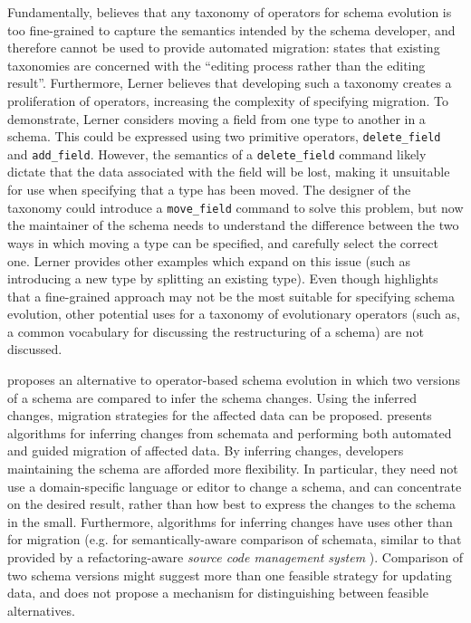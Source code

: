 Fundamentally, \cite{lerner00model} believes that any taxonomy of operators for schema evolution is too fine-grained to capture the semantics intended by the schema developer, and therefore cannot be used to provide automated migration: \cite{lerner00model} states that existing taxonomies are concerned with the ``editing process rather than the editing result''. Furthermore, Lerner believes that developing such a taxonomy creates a proliferation of operators, increasing the complexity of specifying migration. To demonstrate, Lerner  considers moving a field from one type to another in a schema. This could be expressed using two primitive operators, \verb|delete_field| and \verb|add_field|. However, the semantics of a \verb|delete_field| command likely dictate that the data associated with the field will be lost, making it unsuitable for use when specifying that a type has been moved. The designer of the taxonomy could introduce a \verb|move_field| command to solve this problem, but now the maintainer of the schema needs to understand the difference between the two ways in which moving a type can be specified, and carefully select the correct one. Lerner provides other examples which expand on this issue (such as introducing a new type by splitting an existing type). Even though \cite{lerner00model} highlights that a fine-grained approach may not be the most suitable for specifying schema evolution,  other potential uses for a taxonomy of evolutionary operators (such as, a common vocabulary for discussing the restructuring of a schema) are not discussed.

\cite{lerner00model} proposes an alternative to operator-based schema evolution in which two versions of a schema are compared to infer the schema changes. Using the inferred changes, migration strategies for the affected data can be proposed. \cite{lerner00model} presents algorithms for inferring changes from schemata and performing both automated and guided migration of affected data. By inferring changes, developers maintaining the schema are afforded more flexibility. In particular, they need not use a domain-specific language or editor to change a schema, and can concentrate on the desired result, rather than how best to express the changes to the schema in the small. Furthermore, algorithms for inferring changes have uses other than for migration (e.g. for semantically-aware comparison of schemata, similar to that provided by a refactoring-aware \textit{source code management system} \cite{dig07cms}). Comparison of two schema versions might suggest more than one feasible strategy for updating data, and \cite{lerner00model} does not propose a mechanism for distinguishing between feasible alternatives.

